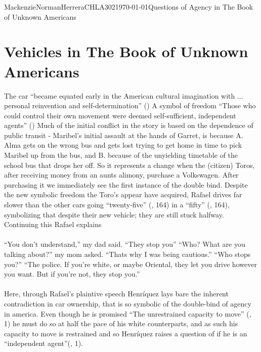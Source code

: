 \documentclass{article}
\begin{document}
\begin{mla}{Mackenzie}{Norman}{Herrera}{CHLA302}{\today}{Questions of Agency in The Book of Unknown Americans}
\section*{Vehicles in The Book of Unknown Americans}
The car ``became equated early in the American cultural imagination with ... personal reinvention and self-determination'' (\cite{Uhlman2015-qx}) A symbol of freedom ``Those who could control their own movement were deemed self-sufficient, independent agents'' (\cite{Uhlman2015-qx}) Much of the initial conflict in the story is based on the dependence of public transit - Maribel's initial assault at the hands of Garret, is because A. Alma gets on the wrong bus and gets lost trying to get home in time to pick Maribel up from the bus, and B. because of the unyielding timetable of the school bus that drops her off. So it represents a change when the (citizen) Toros, after receiving money from an aunts alimony, purchase a Volkswagen. After purchasing it we immediately see the first instance of the double bind. Despite the new symbolic freedom the Toro's appear have acquired, Rafael drives far slower than the other cars going ``twenty-five'' (\cite{Henriquez2014-sh}, 164) in a ``fifty'' (\cite{Henriquez2014-sh}, 164), symbolizing that despite their new vehicle; they are still stuck halfway. Continuing this Rafael explains
\paragraph{}
\noindent ``You don't understand,'' my dad said. ``They stop you''
\noindent\linebreak
``Who? What are you talking about?'' my mom asked.
\noindent\linebreak
``Thats why I was being cautious.''
\noindent\linebreak
``Who stops you?''
\noindent\linebreak
``The police. If you're white, or maybe Oriental, they let you drive however you want. But if you're not, they stop you.''
\paragraph{}
Here, through Rafael's plaintive speech Henríquez lays bare the inherent contradiction in car ownership, that is so symbolic of the double-bind of agency in america. Even though he is promised ``The unrestrained capacity to move'' (\cite{Uhlman2015-qx}, 1) he must do so at half the pace of his white counterparts, and as such his capacity to move is restrained and so Henríquez raises a question of if he is an ``independent agent''(\cite{Uhlman2015-qx}, 1).


\end{mla}
\end{document}
